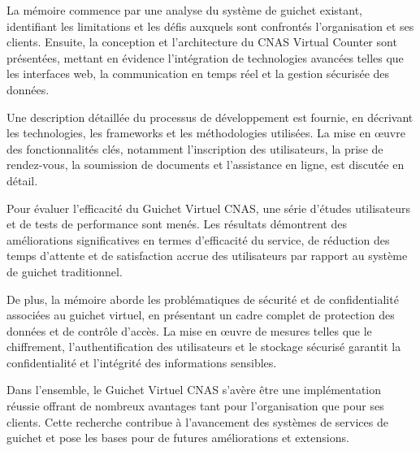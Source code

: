 \documentclass[12pt]{report}
\begin{document}
            La mémoire commence par une analyse du système de guichet existant, identifiant les limitations et les défis auxquels sont confrontés l'organisation et ses clients. Ensuite, la conception et l'architecture du CNAS Virtual Counter sont présentées, mettant en évidence l'intégration de technologies avancées telles que les interfaces web, la communication en temps réel et la gestion sécurisée des données.
            
            Une description détaillée du processus de développement est fournie, en décrivant les technologies, les frameworks et les méthodologies utilisées. La mise en œuvre des fonctionnalités clés, notamment l'inscription des utilisateurs, la prise de rendez-vous, la soumission de documents et l'assistance en ligne, est discutée en détail.
            
            Pour évaluer l'efficacité du Guichet Virtuel CNAS, une série d'études utilisateurs et de tests de performance sont menés. Les résultats démontrent des améliorations significatives en termes d'efficacité du service, de réduction des temps d'attente et de satisfaction accrue des utilisateurs par rapport au système de guichet traditionnel.
            
            De plus, la mémoire aborde les problématiques de sécurité et de confidentialité associées au guichet virtuel, en présentant un cadre complet de protection des données et de contrôle d'accès. La mise en œuvre de mesures telles que le chiffrement, l'authentification des utilisateurs et le stockage sécurisé garantit la confidentialité et l'intégrité des informations sensibles.
            
            Dans l'ensemble, le Guichet Virtuel CNAS s'avère être une implémentation réussie offrant de nombreux avantages tant pour l'organisation que pour ses clients. Cette recherche contribue à l'avancement des systèmes de services de guichet et pose les bases pour de futures améliorations et extensions.
            \vspace*{\fill}
        \thispagestyle{empty}  
                    
\tableofcontents
\listoffigures
\listoftables





\end{document}
